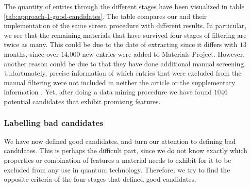 \noindent The quantity of entries through the different stages have been visualized in table \ref{tab:approach-1-good-candidates}. The table compares our and their implementation of the same screen procedure with different results. In particular, we see that the remaining materials that have survived four stages of filtering are twice as many. This could be due to the date of extracting since it differs with $13$ months, since over $14.000$ new entries were added to Materials Project. However, another reason could be due to that they have done additional manual screening. Unfortunately, precise information of which entries that were excluded from the manual filtering were not included in neither the article or the supplementary information \cite{Ferrenti2020}. Yet, after doing a data mining procedure we have found $1046$ potential candidates that exhibit promising features.

\begin{table}[!ht]
\centering
\caption{A table that compares two different implementations of the same screen procedure. \citeauthor{Ferrenti2020} extracted information March of $2020$, while we did the extraction during April of $2021$. The adjusted difference is given as our reported entries divided on their reported entries.}
\label{tab:approach-1-good-candidates}
\noindent{}
\end{table}

\subsubsection{Labelling bad candidates}

We have now defined good candidates, and turn our attention to defining bad candidates. This is perhaps the difficult part, since we do not know exactly which properties or combination of features a material needs to exhibit for it to be excluded from any use in quantum technology. Therefore, we try to find the opposite criteria of the four stages that defined good candidates.

